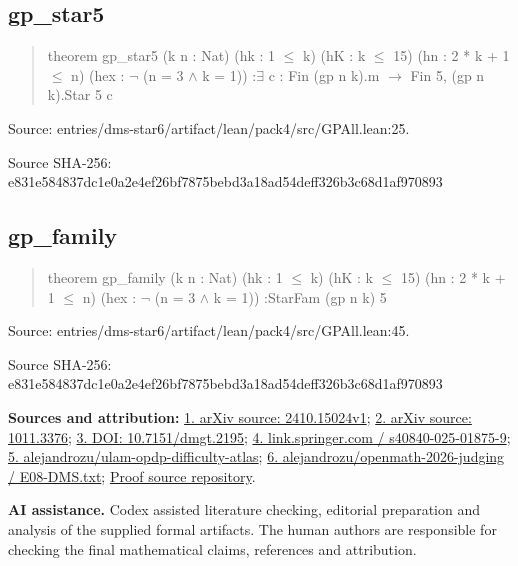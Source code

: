 \documentclass[11pt,a4paper]{article}
\begin{document}
\begin{samepage}
\subsection{gp\_star5}
\begin{quote}\small\ttfamily theorem gp\_star5 (k n : Nat) (hk : 1 \ensuremath{\leq} k) (hK : k \ensuremath{\leq} 15) (hn : 2 * k + 1 \ensuremath{\leq} n) (hex : \ensuremath{\neg} (n = 3 \ensuremath{\wedge} k = 1)) :\newline     \ensuremath{\exists} c : Fin (gp n k).m \ensuremath{\to} Fin 5, (gp n k).Star 5 c\end{quote}
{\small Source: entries/dms-star6/artifact/lean/pack4/src/GPAll.lean:25.\par}

{\small Source SHA-256: e831e584837dc1e0a2e4ef26bf7875bebd3a18ad54deff326b3c68d1af970893\par}

\end{samepage}
\begin{samepage}
\subsection{gp\_family}
\begin{quote}\small\ttfamily theorem gp\_family (k n : Nat) (hk : 1 \ensuremath{\leq} k) (hK : k \ensuremath{\leq} 15) (hn : 2 * k + 1 \ensuremath{\leq} n) (hex : \ensuremath{\neg} (n = 3 \ensuremath{\wedge} k = 1)) :\newline     StarFam (gp n k) 5\end{quote}
{\small Source: entries/dms-star6/artifact/lean/pack4/src/GPAll.lean:45.\par}

{\small Source SHA-256: e831e584837dc1e0a2e4ef26bf7875bebd3a18ad54deff326b3c68d1af970893\par}

{\small\textbf{Sources and attribution:} \href{https://arxiv.org/html/2410.15024v1}{1. arXiv source: 2410.15024v1}; \href{https://arxiv.org/abs/1011.3376}{2. arXiv source: 1011.3376}; \href{https://doi.org/10.7151/dmgt.2195}{3. DOI: 10.7151/dmgt.2195}; \href{https://link.springer.com/article/10.1007/s40840-025-01875-9}{4. link.springer.com / s40840-025-01875-9}; \href{https://github.com/alejandrozu/ulam-opdp-difficulty-atlas}{5. alejandrozu/ulam-opdp-difficulty-atlas}; \href{https://github.com/alejandrozu/openmath-2026-judging/blob/d0ed487f487fa7ec814ff705ab55249983fe8707/OpenMath-Judging/review/entries/E08-DMS.txt}{6. alejandrozu/openmath-2026-judging / E08-DMS.txt}; \href{https://github.com/alejandrozu/openmath-2026-judging}{Proof source repository}.\par}

\end{samepage}
{\small \textbf{AI assistance.} Codex assisted literature checking, editorial preparation and analysis of the supplied formal artifacts. The human authors are responsible for checking the final mathematical claims, references and attribution.\par}
\end{document}
